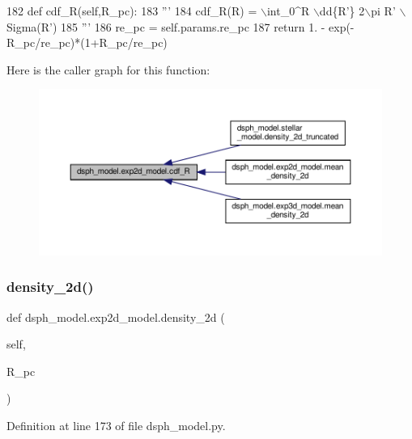 \begin{DoxyCode}
182     \textcolor{keyword}{def }cdf\_R(self,R\_pc):
183         \textcolor{stringliteral}{'''}
184 \textcolor{stringliteral}{        cdf\_R(R) = \(\backslash\)int\_0^R \(\backslash\)dd\{R'\} 2\(\backslash\)pi R' \(\backslash\)Sigma(R')}
185 \textcolor{stringliteral}{        '''}
186         re\_pc = self.params.re\_pc
187         \textcolor{keywordflow}{return} 1. - exp(-R\_pc/re\_pc)*(1+R\_pc/re\_pc)
\end{DoxyCode}
Here is the caller graph for this function\+:\nopagebreak
\begin{figure}[H]
\begin{center}
\leavevmode
\includegraphics[width=350pt]{df/d3d/classdsph__model_1_1exp2d__model_a3a8c90e796e589216687bbe3cf4e42c5_icgraph}
\end{center}
\end{figure}
\mbox{\label{classdsph__model_1_1exp2d__model_a41d0f3f53b8a31f9b64c71c733e7718e}} 
\subsubsection{\texorpdfstring{density\+\_\+2d()}{density\_2d()}}
{\footnotesize\ttfamily def dsph\+\_\+model.\+exp2d\+\_\+model.\+density\+\_\+2d (\begin{DoxyParamCaption}\item[{}]{self,  }\item[{}]{R\+\_\+pc }\end{DoxyParamCaption})}



Definition at line 173 of file dsph\+\_\+model.\+py.


